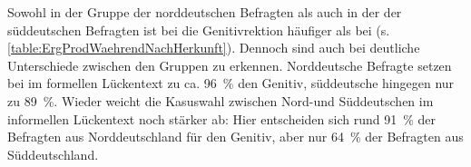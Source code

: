 Sowohl in der Gruppe der norddeutschen Befragten als auch in der der süddeutschen Befragten ist bei \waehrend{} die Genitivrektion häufiger als bei \wegen{} (s. \autoref{table:ErgProdWaehrendNachHerkunft}). 
Dennoch sind auch bei \waehrend{} deutliche Unterschiede zwischen den Gruppen zu erkennen. 
Norddeutsche Befragte setzen bei \waehrend{} im formellen Lückentext zu ca. 96~\% den Genitiv, süddeutsche hingegen nur zu 89~\%. 
Wieder weicht die Kasuswahl zwischen Nord-und Süddeutschen im informellen Lückentext noch stärker ab: 
Hier entscheiden sich rund 91~\% der Befragten aus Norddeutschland für den Genitiv, aber nur 64~\% der Befragten aus Süddeutschland.  
